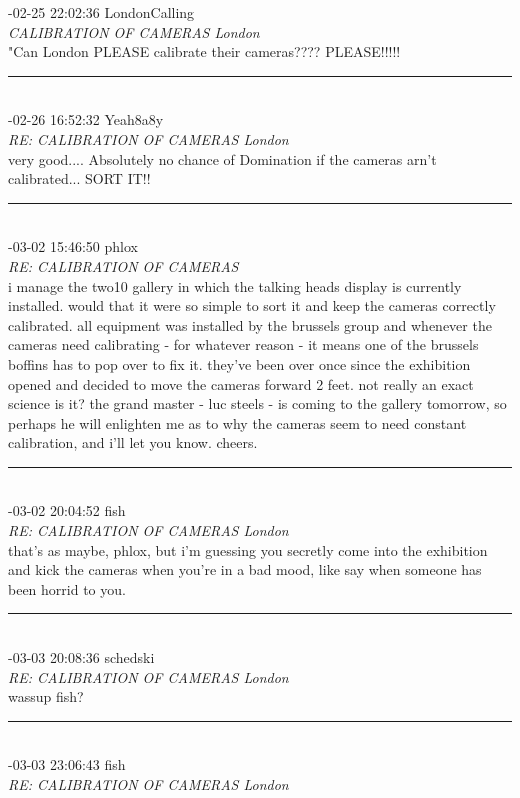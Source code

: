 \begin{mail}
{-02-25 22:02:36 LondonCalling}\\
{\itshape CALIBRATION OF CAMERAS London}\\
"Can London PLEASE calibrate their cameras???? PLEASE!!!!!\\
\rule{0.8\textwidth}{.4pt}\\
{-02-26 16:52:32 Yeah8a8y}\\
{\itshape RE: CALIBRATION OF CAMERAS London}\\
very good.... Absolutely no chance of Domination if the cameras arn't calibrated... SORT IT!!\\
\rule{0.8\textwidth}{.4pt}\\
{-03-02 15:46:50} phlox\\
{\itshape RE: CALIBRATION OF CAMERAS}\\
i manage the two10 gallery in which the talking heads display is currently installed. would that it were so simple to sort it and keep the cameras correctly calibrated. all equipment was installed by the brussels group and whenever the cameras need calibrating - for whatever reason - it means one of the brussels boffins has to pop over to fix it. they've been over once since the exhibition opened and decided to move the cameras forward 2 feet. not really an exact science is it? the grand master - luc steels - is coming to the gallery tomorrow, so perhaps he will enlighten me as to why the cameras seem to need constant calibration, and i'll let you know. cheers.\\
\rule{0.8\textwidth}{.4pt}\\
{-03-02 20:04:52 fish}\\
{\itshape RE: CALIBRATION OF CAMERAS London}\\
that's as maybe, phlox, but i'm guessing you secretly come into the exhibition and kick the cameras when 
you're in a bad mood, like say when someone has been horrid to you.\\
\rule{0.8\textwidth}{.4pt}\\
{-03-03 20:08:36 schedski}\\
{\itshape RE: CALIBRATION OF CAMERAS London}\\
wassup fish?\\
\rule{0.8\textwidth}{.4pt}\\
{-03-03 23:06:43 fish}\\
{\itshape RE: CALIBRATION OF CAMERAS London}\\

\end{mail}
